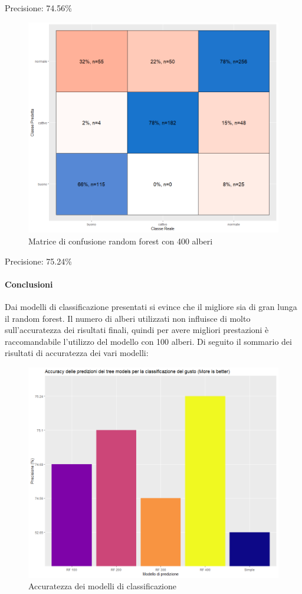 \documentclass[12pt]{article}
\begin{document}
\FloatBarrier
Precisione: 74.56\%
\begin{figure}[!htb]
    \centering
    \includegraphics[width=1\textwidth]{immagini/conf400.png}
    \caption{Matrice di confusione random forest con 400 alberi}
\end{figure}
\FloatBarrier
Precisione: 75.24\%
\paragraph{Conclusioni} Dai modelli di classificazione presentati si evince che il migliore sia di gran lunga il random forest. Il numero di alberi utilizzati non influisce di molto sull'accuratezza dei risultati finali, quindi per avere migliori prestazioni è raccomandabile l'utilizzo del modello con 100 alberi. Di seguito il sommario dei risultati di accuratezza dei vari modelli:
\begin{figure}[!htb]
    \centering
    \includegraphics[width=1\textwidth]{immagini/acc.png}
    \caption{Accuratezza dei modelli di classificazione}
\end{figure}
\FloatBarrier
\end{document}
